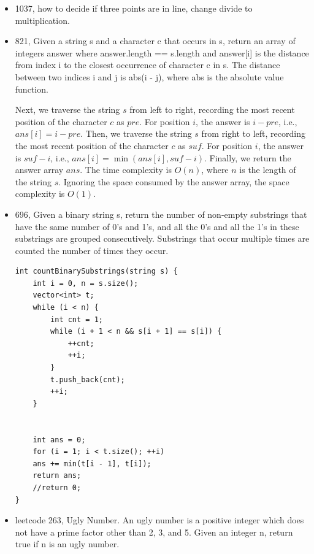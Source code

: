 \documentclass[a4paper,11pt,twoside]{book}
\begin{document}
\begin{itemize}
	We can use two pointers low and high to represent the current minimum and maximum values, respectively. Then, we traverse the string s. If the current character is I, we add low to the result array, and increment low by 1; if the current character is D, we add high to the result array, and decrement high by 1. Finally, we add low to the result array and return the result array.
	
	\item  1037,  how to decide if three points are in line, change divide to multiplication. 
	
	\item 821, Given a string s and a character c that occurs in s, return an array of integers answer where answer.length == s.length and answer[i] is the distance from index i to the closest occurrence of character c in s. The distance between two indices i and j is abs(i - j), where abs is the absolute value function.
	
	Next, we traverse the string $s$ from left to right, recording the most recent position of the character $c$ as $pre$. For position $i$, the answer is $i - pre$, i.e., $ans[i] = i - pre$. Then, we traverse the string $s$ from right to left, recording the most recent position of the character $c$ as $suf$. For position $i$, the answer is $suf - i$, i.e., $ans[i] = \min(ans[i], suf - i)$. Finally, we return the answer array $ans$. The time complexity is $O(n)$, where $n$ is the length of the string $s$. Ignoring the space consumed by the answer array, the space complexity is $O(1)$.	
	
	\item 696, Given a binary string s, return the number of non-empty substrings that have the same number of 0's and 1's, and all the 0's and all the 1's in these substrings are grouped consecutively. Substrings that occur multiple times are counted the number of times they occur. 
\begin{lstlisting}
int countBinarySubstrings(string s) {
	int i = 0, n = s.size();
	vector<int> t;
	while (i < n) {
		int cnt = 1;
		while (i + 1 < n && s[i + 1] == s[i]) {
			++cnt;
			++i;
		}
		t.push_back(cnt);
		++i;
	}
	
	
	int ans = 0;
	for (i = 1; i < t.size(); ++i) 
	ans += min(t[i - 1], t[i]);
	return ans;
	//return 0;
}	
\end{lstlisting}		
	
	\item leetcode 263, Ugly Number. An ugly number is a positive integer which does not have a prime factor other than 2, 3, and 5. Given an integer n, return true if n is an ugly number. 
		

\end{itemize}
\end{document}
